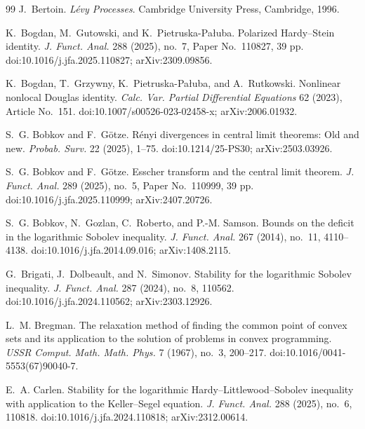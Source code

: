 \documentclass[11pt,reqno]{amsart}
\theoremstyle{plain}
\theoremstyle{definition}
\numberwithin{equation}{section}
\begin{document}
\begin{thebibliography}{99}
J.~Bertoin.
\newblock \emph{L{\'e}vy Processes}.
\newblock Cambridge University Press, Cambridge, 1996.

K.~Bogdan, M.~Gutowski, and K.~Pietruska-Pa{\l}uba.
\newblock Polarized Hardy--Stein identity.
\newblock \emph{J. Funct. Anal.} 288 (2025), no.~7, Paper No.~110827,
39 pp.
\newblock doi:10.1016/j.jfa.2025.110827; arXiv:2309.09856.

K.~Bogdan, T.~Grzywny, K.~Pietruska-Pa{\l}uba, and A.~Rutkowski.
\newblock Nonlinear nonlocal Douglas identity.
\newblock \emph{Calc. Var. Partial Differential Equations} 62 (2023),
Article No.~151.
\newblock doi:10.1007/s00526-023-02458-x; arXiv:2006.01932.

S.~G. Bobkov and F.~G\"otze.
\newblock R\'enyi divergences in central limit theorems: Old and new.
\newblock \emph{Probab. Surv.} 22 (2025), 1--75.
\newblock doi:10.1214/25-PS30; arXiv:2503.03926.

S.~G. Bobkov and F.~G\"otze.
\newblock Esscher transform and the central limit theorem.
\newblock \emph{J. Funct. Anal.} 289 (2025), no.~5, Paper No.~110999,
39 pp.
\newblock doi:10.1016/j.jfa.2025.110999; arXiv:2407.20726.

S.~G. Bobkov, N.~Gozlan, C.~Roberto, and P.-M. Samson.
\newblock Bounds on the deficit in the logarithmic Sobolev inequality.
\newblock \emph{J. Funct. Anal.} 267 (2014), no.~11, 4110--4138.
\newblock doi:10.1016/j.jfa.2014.09.016; arXiv:1408.2115.

G.~Brigati, J.~Dolbeault, and N.~Simonov.
\newblock Stability for the logarithmic Sobolev inequality.
\newblock \emph{J. Funct. Anal.} 287 (2024), no.~8, 110562.
\newblock doi:10.1016/j.jfa.2024.110562; arXiv:2303.12926.

L.~M. Bregman.
\newblock The relaxation method of finding the common point of convex sets and
its application to the solution of problems in convex programming.
\newblock \emph{USSR Comput. Math. Math. Phys.} 7 (1967), no.~3, 200--217.
\newblock doi:10.1016/0041-5553(67)90040-7.

E.~A. Carlen.
\newblock Stability for the logarithmic Hardy--Littlewood--Sobolev inequality
with application to the Keller--Segel equation.
\newblock \emph{J. Funct. Anal.} 288 (2025), no.~6, 110818.
\newblock doi:10.1016/j.jfa.2024.110818; arXiv:2312.00614.


\end{thebibliography}
\end{document}
